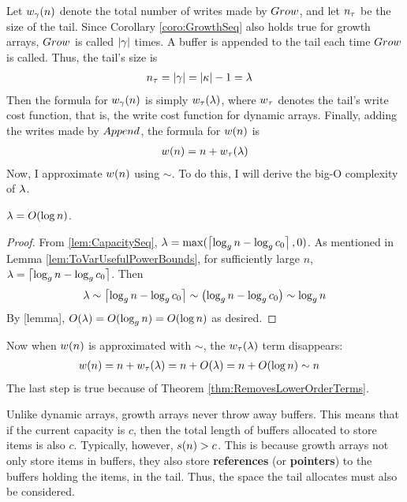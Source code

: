 Let ${w}_{\gamma}(n)$ denote the total number of writes made by $Grow$, and let $n_\tau$ be the size of the tail. Since Corollary \ref{coro:GrowthSeq} also holds true for growth arrays, $Grow$ is called $|\gamma|$ times. A buffer is appended to the tail each time $Grow$ is called. Thus, the tail's size is
\begin{align*}
n_\tau &= |\gamma| = |\kappa| - 1 = \lambda
\end{align*}
Then the formula for ${w}_{\gamma}(n)$ is simply $w_\tau(\lambda)$, where $w_\tau$ denotes the tail's write cost function, that is, the write cost function for dynamic arrays. Finally, adding the writes made by $Append$, the formula for $w(n)$ is
\begin{align*}
w(n) = n + w_\tau(\lambda)
\end{align*}
Now, I approximate $w(n)$ using $\sim$. To do this, I will derive the big-O complexity of $\lambda$.

\begin{lemma}
\label{lem:VarUsefulIsOLogN}
	$\lambda = O(\log n)$.
\end{lemma}

\begin{proof}
	From \ref{lem:CapacitySeq}, $\lambda = \max(\left\lceil \log_{g} n - \log_{g} c_0 \right\rceil, 0)$. As mentioned in Lemma \ref{lem:ToVarUsefulPowerBounds}, for sufficiently large $n$, $\lambda = \left\lceil \log_{g} n - \log_{g} c_0 \right\rceil$. Then
	\begin{align*}
	\lambda \sim \left\lceil \log_{g} n - \log_{g} c_0 \right\rceil \sim \left( \log_{g} n - \log_{g} c_0 \right) \sim \log_{g} n
	\end{align*}
	By [lemma], $O(\lambda) = O(\log_{g} n) = O(\log n)$ as desired.
\end{proof}

Now when $w(n)$ is approximated with $\sim$, the $w_\tau(\lambda)$ term disappears:
\begin{align*}
w(n) &= n + w_\tau(\lambda) = n + O(\lambda) = n + O(\log n) \sim n
\end{align*}
The last step is true because of Theorem \ref{thm:RemovesLowerOrderTerms}.

\HdrSpaceComplex

Unlike dynamic arrays, growth arrays never throw away buffers. This means that if the current capacity is $c$, then the total length of buffers allocated to store items is also $c$. Typically, however, $s(n) > c$. This is because growth arrays not only store items in buffers, they also store \textbf{references} (or \textbf{pointers}) to the buffers holding the items, in the tail. Thus, the space the tail allocates must also be considered.

